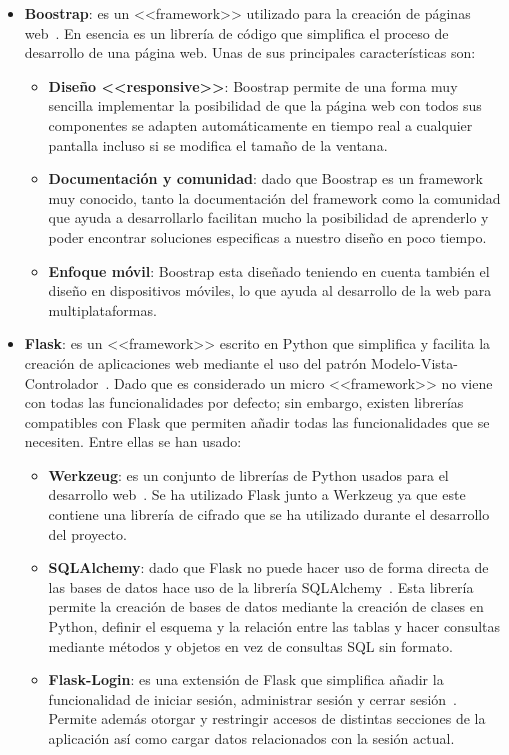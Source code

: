 \begin{itemize}
\item \textbf{Boostrap}: es un <<framework>> utilizado para la creación de páginas web~\cite{boostrap}. En esencia es un librería de código que simplifica el proceso de desarrollo de una página web. Unas de sus principales características son:
\begin{itemize}
\item \textbf{Diseño <<responsive>>}: Boostrap permite de una forma muy sencilla implementar la posibilidad de que la página web con todos sus componentes se adapten automáticamente en tiempo real a cualquier pantalla incluso si se modifica el tamaño de la ventana.
\item \textbf{Documentación y comunidad}: dado que Boostrap es un framework muy conocido, tanto la documentación del framework como la comunidad que ayuda a desarrollarlo facilitan mucho la posibilidad de aprenderlo y poder encontrar soluciones especificas a nuestro diseño en poco tiempo.
\item \textbf{Enfoque móvil}: Boostrap esta diseñado teniendo en cuenta también el diseño en dispositivos móviles, lo que ayuda al desarrollo de la web para multiplataformas.
\end{itemize}
\item \textbf{Flask}: es un <<framework>> escrito en Python  que simplifica y facilita la creación de aplicaciones web mediante el uso del patrón Modelo-Vista-Controlador~\cite{flask}. Dado que es considerado un micro <<framework>> no viene con todas las funcionalidades por defecto; sin embargo, existen librerías compatibles con Flask que permiten añadir todas las funcionalidades que se necesiten. Entre ellas se han usado:
\begin{itemize}
\item \textbf{Werkzeug}: es un conjunto de librerías de Python usados para el desarrollo web~\cite{werkzeug}. Se ha utilizado Flask junto a Werkzeug ya que este contiene una librería de cifrado que se ha utilizado durante el desarrollo del proyecto.
\item \textbf{SQLAlchemy}: dado que Flask no puede hacer uso de forma directa de las bases de datos hace uso de la librería SQLAlchemy~\cite{sqlalchemy}. Esta librería permite la creación de bases de datos mediante la creación de clases en Python, definir el esquema y la relación entre las tablas y hacer consultas mediante métodos y objetos en vez de consultas SQL sin formato.
\item \textbf{Flask-Login}: es una extensión de Flask que simplifica añadir la funcionalidad de iniciar sesión, administrar sesión y cerrar sesión~\cite{flasklogin}. Permite además otorgar y restringir accesos de distintas secciones de la aplicación así como cargar datos relacionados con la sesión actual.

\end{itemize}
\end{itemize}
